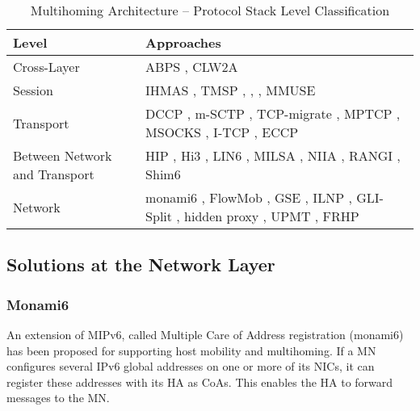 \documentclass[preprint,12pt]{elsarticle}
\begin{document}
\begin{table*}[t]
\caption{Multihoming Architecture -- Protocol Stack Level Classification}
\label{tab:m_nic}
 \centering
 \scriptsize
 \begin{tabular}{|l|C{8cm}|}
 \hline
 \hline
  {\bf Level} & {\bf Approaches} \\
 \hline
 \hline
 Cross-Layer & ABPS \cite{GhiniJSS}, CLW2A \cite{FerrettiG09} \\
 \hline
 Session & IHMAS \cite{Bellavista:2010}, TMSP 
	   \cite{LimYLL09}, \cite{Udugama:2007}, \cite{Kalmanek:2006},
	   MMUSE \cite{SalsanoPMNV08}\\
 \hline
 Transport & DCCP \cite{rfc4340}, m-SCTP \cite{Budzisz:2012}, TCP-migrate 
	     \cite{snoeren2001reconsidering}, MPTCP \cite{mptcp,Paasch:2012}, 
	     MSOCKS \cite{msocks}, I-TCP \cite{itcp}, ECCP \cite{eccp}
 \\
 \hline
 Between Network and Transport & HIP \cite{BokorZNJ09,rfc4423}, 
	      Hi3 \cite{GurtovKLN08}, LIN6 \cite{draft-teraoka-ipng}, 
	      MILSA \cite{Pan:2010}, NIIA \cite{niia,Schutz:2010}, 
	      RANGI \cite{rangi}, 
	      Shim6 \cite{rfc5533} \\ 
 \hline
 Network & monami6 \cite{li07,rfc4861}, FlowMob \cite{Toseef:2008}, 
	   GSE \cite{draft-ipng-gseaddr-00.txt},
	   ILNP \cite{rfc6740}, GLI-Split \cite{gli-split}, 
	   hidden proxy \cite{ghi06}, UPMT \cite{Bonola:2009},
	   FRHP \cite{Giordano:2012} \\
 \hline
 \hline
\end{tabular}
\end{table*}



\subsection{Solutions at the Network Layer}

\subsubsection{Monami6}
An extension of MIPv6, called Multiple Care of Address registration (monami6) 
\cite{li07,rfc4861,Wakikawa03multiplecare-of-address,pan2008,sousa11} has been 
proposed for supporting host mobility and multihoming. 
If a MN configures several IPv6 global addresses on one or more of its 
NICs, it can register these addresses with its \ac{HA} as \acp{CoA}. This 
enables the \ac{HA} to forward messages to the MN.  
\end{document}
